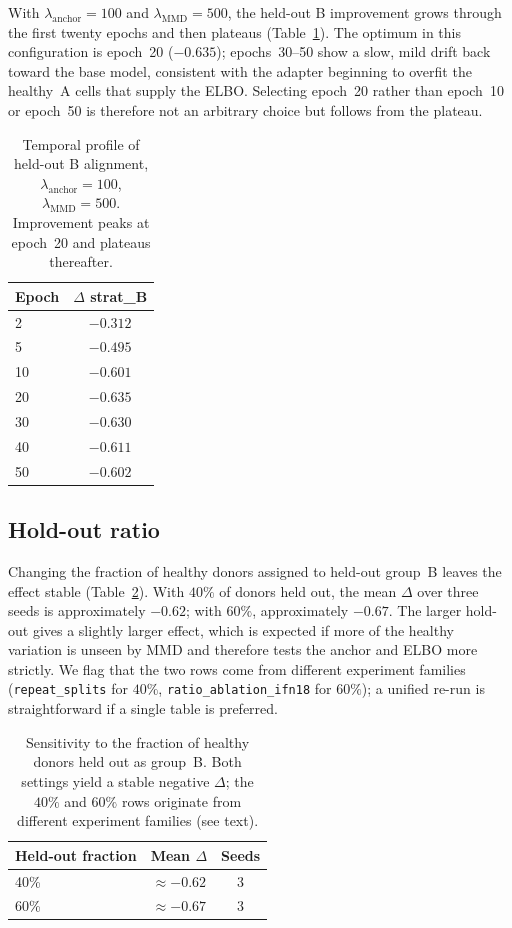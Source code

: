 \documentclass[12pt, a4paper]{article}
\begin{document}
With \(\lambda_{\text{anchor}}=100\) and
\(\lambda_{\text{MMD}}=500\), the held-out B improvement grows through
the first twenty epochs and then plateaus
(Table~\ref{tab:temporal}). The optimum in this configuration is
epoch~20 (\(-0.635\)); epochs~30--50 show a slow, mild drift back toward
the base model, consistent with the adapter beginning to overfit the
healthy~A cells that supply the ELBO. Selecting epoch~20 rather than
epoch~10 or epoch~50 is therefore not an arbitrary choice but follows
from the plateau.

\begin{table}[H]
\centering
\caption{Temporal profile of held-out B alignment,
\(\lambda_{\text{anchor}}=100\), \(\lambda_{\text{MMD}}=500\). Improvement
peaks at epoch~20 and plateaus thereafter.}
\label{tab:temporal}
\begin{tabular}{lc}
\toprule
Epoch & \(\Delta\) strat\_B \\
\midrule
2  & \(-0.312\) \\
5  & \(-0.495\) \\
10 & \(-0.601\) \\
20 & \(\mathbf{-0.635}\) \\
30 & \(-0.630\) \\
40 & \(-0.611\) \\
50 & \(-0.602\) \\
\bottomrule
\end{tabular}
\end{table}


\subsection{Hold-out ratio}

Changing the fraction of healthy donors assigned to held-out group~B
leaves the effect stable (Table~\ref{tab:ratio}). With \(40\%\) of donors
held out, the mean \(\Delta\) over three seeds is approximately
\(-0.62\); with \(60\%\), approximately \(-0.67\). The larger hold-out
gives a slightly larger effect, which is expected if more of the healthy
variation is unseen by MMD and therefore tests the anchor and ELBO more
strictly. We flag that the two rows come from different experiment
families (\texttt{repeat\_splits} for \(40\%\),
\texttt{ratio\_ablation\_ifn18} for \(60\%\)); a unified re-run is
straightforward if a single table is preferred.

\begin{table}[H]
\centering
\caption{Sensitivity to the fraction of healthy donors held out as
group~B. Both settings yield a stable negative \(\Delta\); the \(40\%\)
and \(60\%\) rows originate from different experiment families (see
text).}
\label{tab:ratio}
\begin{tabular}{lcc}
\toprule
Held-out fraction & Mean \(\Delta\) & Seeds \\
\midrule
40\% & \(\approx -0.62\) & 3 \\
60\% & \(\approx -0.67\) & 3 \\
\bottomrule
\end{tabular}
\end{table}
\end{document}
